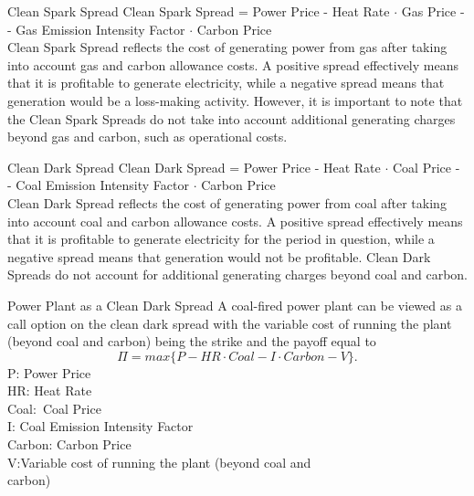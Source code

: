 {Clean Spark Spread}
Clean Spark Spread = Power Price - Heat Rate $\cdot$ Gas Price -\\- Gas Emission Intensity Factor $\cdot$ Carbon Price\\
  \vspace{0.6cm}
Clean Spark Spread reflects the cost of generating power from gas after taking into account gas and carbon allowance costs. A positive spread effectively means that it is profitable to generate electricity, while a negative spread means that generation would be a loss-making activity. However, it is important to note that the Clean Spark Spreads do not take into account additional generating charges beyond gas and carbon, such as operational costs.





{Clean Dark Spread}
Clean Dark Spread = Power Price - Heat Rate $\cdot$ Coal Price -\\- Coal Emission Intensity Factor $\cdot$ Carbon Price\\
  \vspace{0.6cm}
Clean Dark Spread reflects the cost of generating power from coal after taking into account coal and carbon allowance costs. A positive spread effectively means that it is profitable to generate electricity for the period in question, while a negative spread means that generation would not be profitable. Clean Dark Spreads do not account for additional generating charges beyond coal and carbon.





{Power Plant as a Clean Dark Spread}
A coal-fired power plant can be viewed as a call option on the clean dark spread with the variable cost of running the plant (beyond coal and carbon) being the strike and the payoff equal to\\
$$\Pi=max\{P-HR\cdot Coal - I\cdot Carbon - V\}.$$
P:\quad\;\;\;\;\; Power Price\\
HR:\quad\;\;\; Heat Rate\\
Coal:\quad\, Coal Price\\
I:\qquad\;\;\; Coal Emission Intensity Factor\\
Carbon: Carbon Price\\
V:\qquad\quad Variable cost of running the plant (beyond coal and\\
\qquad\quad\;\;\; carbon)



